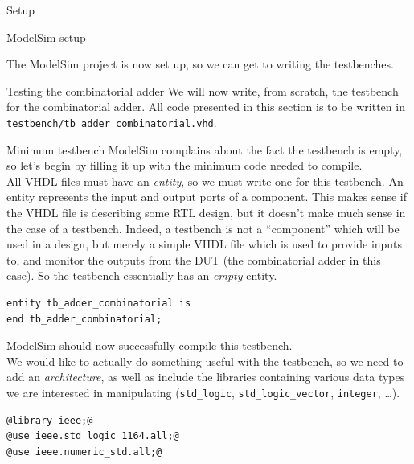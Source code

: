 \documentclass[lab]{course}
\begin{document}
\begin{section}{Setup}
\begin{subsection}{ModelSim setup}
\begin{enumerate}
                The ModelSim project is now set up, so we can get to writing the testbenches.
        \end{enumerate}
    \end{subsection}
\end{section}

\clearpage

\begin{section}{Testing the combinatorial adder}
    We will now write, from scratch, the testbench for the combinatorial adder. All code presented in this section is to be written in \verb+testbench/tb_adder_combinatorial.vhd+.

    \begin{subsection}{Minimum testbench}
        ModelSim complains about the fact the testbench is empty, so let's begin by filling it up with the minimum code needed to compile. \\

        All VHDL files must have an \emph{entity}, so we must write one for this testbench. An entity represents the input and output ports of a component. This makes sense if the VHDL file is describing some RTL design, but it doesn't make much sense in the case of a testbench. Indeed, a testbench is not a ``component'' which will be used in a design, but merely a simple VHDL file which is used to provide inputs to, and monitor the outputs from the DUT (the combinatorial adder in this case). So the testbench essentially has an \emph{empty} entity.

        \begin{lstlisting}[caption={Minimum testbench (only empty entity)}, label={lst:combinatorial_minimum_testbench}]
entity tb_adder_combinatorial is
end tb_adder_combinatorial;
        \end{lstlisting}
    \end{subsection}

    ModelSim should now successfully compile this testbench. \\

    We would like to actually do something useful with the testbench, so we need to add an \emph{architecture}, as well as include the libraries containing various data types we are interested in manipulating (\verb+std_logic+, \verb+std_logic_vector+, \verb+integer+, \ldots).

    \begin{lstlisting}[caption={Add libraries \& empty architecture}, label={lst:combinatorial_add_libraries_and_empty_architecture}]
@library ieee;@
@use ieee.std_logic_1164.all;@
@use ieee.numeric_std.all;@


\end{lstlisting}
\end{section}
\end{document}
